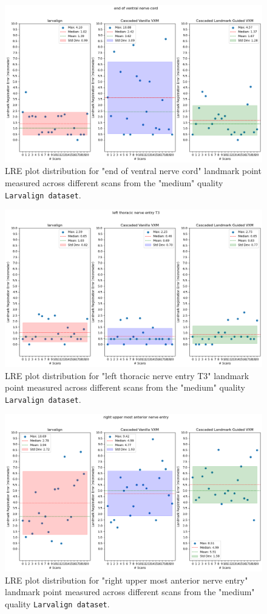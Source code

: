 	\begin{figure}[h!]
		\centering
		\includegraphics[width=0.75\columnwidth]{resources/chapter5_fresh/output/end of ventral nerve cord.png}
		\caption{LRE plot distribution for "end of ventral nerve cord" landmark point measured across different scans from the "medium" quality \texttt{Larvalign dataset}.}
		\label{fig:landmark15}
	\end{figure}

	\begin{figure}[h!]
		\centering
		\includegraphics[width=0.75\columnwidth]{resources/chapter5_fresh/output/left thoracic nerve entry T3.png}
		\caption{LRE plot distribution for "left thoracic nerve entry T3" landmark point measured across different scans from the "medium" quality \texttt{Larvalign dataset}.}
		\label{fig:landmark16}
	\end{figure}

	\begin{figure}[h!]
		\centering
		\includegraphics[width=0.75\columnwidth]{resources/chapter5_fresh/output/right upper most anterior nerve entry.png}
		\caption{LRE plot distribution for "right upper most anterior nerve entry" landmark point measured across different scans from the "medium" quality \texttt{Larvalign dataset}.}
		\label{fig:landmark17}
	\end{figure}

